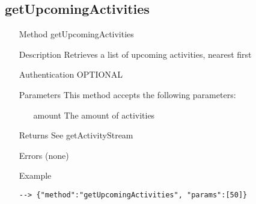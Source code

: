 \documentclass[a4paper]{scrreprt}
\begin{document}
\clearpage
\subsection{getUpcomingActivities}
\begin{enumerate}
\item[Method] getUpcomingActivities
\item[Description] Retrieves a list of upcoming activities, nearest first
\item[Authentication] OPTIONAL
\item[Parameters] This method accepts the following parameters:
\begin{enumerate}
	\item[amount] The amount of activities
    \end{enumerate}
\item[Returns] See getActivityStream
\item[Errors] (none)
\item[Example]
\begin{lstlisting}
--> {"method":"getUpcomingActivities", "params":[50]}
\end{lstlisting}
\end{enumerate}

\clearpage
\end{document}
